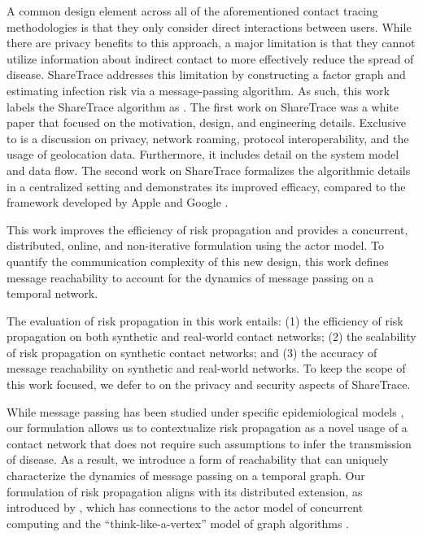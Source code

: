 A common design element across all of the aforementioned contact tracing methodologies is that they only consider direct interactions between users. While there are privacy benefits to this approach, a major limitation is that they cannot utilize information about indirect contact to more effectively reduce the spread of disease. ShareTrace addresses this limitation by constructing a factor graph and estimating infection risk via a message-passing algorithm. As such, this work labels the ShareTrace algorithm as . The first work on ShareTrace was a white paper that focused on the motivation, design, and engineering details. Exclusive to \citet{Ayday2020} is a discussion on privacy, network roaming, protocol interoperability, and the usage of geolocation data. Furthermore, it includes detail on the system model and data flow. The second work on ShareTrace \citep{Ayday2021} formalizes the algorithmic details in a centralized setting and demonstrates its improved efficacy, compared to the framework developed by Apple and Google \cite{AppleGoogle}.

This work improves the efficiency of risk propagation and provides a concurrent, distributed, online, and non-iterative formulation using the actor model. To quantify the communication complexity of this new design, this work defines message reachability to account for the dynamics of message passing on a temporal network. 

The evaluation of risk propagation in this work entails: (1) the efficiency of risk propagation on both synthetic and real-world contact networks; (2) the scalability of risk propagation on synthetic contact networks; and (3) the accuracy of message reachability on synthetic and real-world networks. To keep the scope of this work focused, we defer to \citep{Ayday2021} on the privacy and security aspects of ShareTrace.

While message passing has been studied under specific epidemiological models \citep{Karrer2010, Li2021}, our formulation allows us to contextualize risk propagation as a novel usage of a contact network that does not require such assumptions to infer the transmission of disease. As a result, we introduce a form of reachability that can uniquely characterize the dynamics of message passing on a temporal graph. Our formulation of risk propagation aligns with its distributed extension, as introduced by \citet{Ayday2021}, which has connections to the actor model of concurrent computing \citep{Baker1977, Agha1986} and the ``think-like-a-vertex'' model of graph algorithms \citep{McCune2015}.